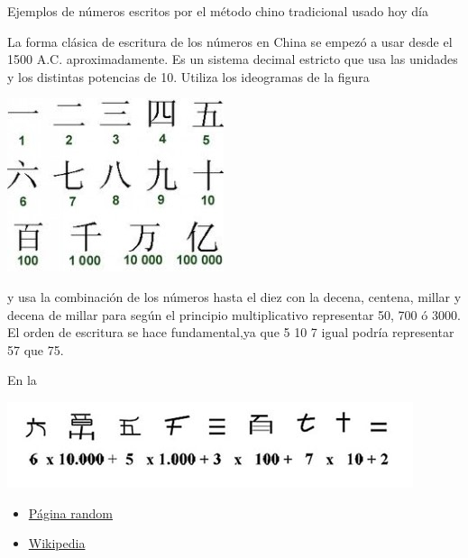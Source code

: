 \begin{problem}[2]
Ejemplos de números escritos por el método chino tradicional usado hoy día

\solution

La forma clásica de escritura de los números en China se empezó a usar desde el 1500 A.C. aproximadamente. Es un sistema decimal estricto que usa las unidades y los distintas potencias de 10. Utiliza los ideogramas de la figura

\begin{center}
\includegraphics[width=0.4\linewidth]{img/numeracion_china.jpg}
\end{center}

y usa la combinación de los números hasta el diez con la decena, centena, millar y decena de millar para según el principio multiplicativo representar 50, 700 ó 3000. El orden de escritura se hace fundamental,ya que 5 10 7 igual podría representar 57 que 75.

En la

\begin{center}
\includegraphics[width=0.6\linewidth]{img/ejemplo_num_chino.jpg}
\end{center}


\begin{itemize}
\item \href{http://www.sectormatematica.cl/historia/chino.htm}{Página random}
\item \href{https://es.wikipedia.org/wiki/Numeracion_china}{Wikipedia}
\end{itemize}
\end{problem}

